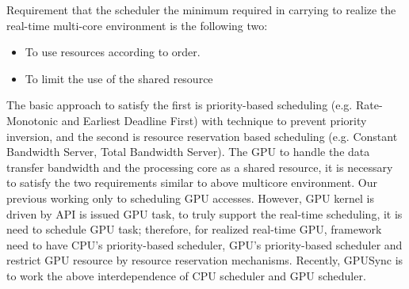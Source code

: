 Requirement that the scheduler the minimum required in carrying to realize the real-time multi-core environment is the following two:
\begin{itemize}
\item To use resources according to order.
\item To limit the use of the shared resource
\end{itemize}
The basic approach to satisfy the first is priority-based scheduling (e.g. Rate-Monotonic\cite{sched:rm} and Earliest Deadline First\cite{sched:edf}) with technique to prevent priority inversion,
and the second is resource reservation based scheduling (e.g. Constant Bandwidth Server\cite{rr:cbs}, Total Bandwidth Server\cite{rr:tbs2}).
The GPU to handle the data transfer bandwidth and the processing core as a shared resource,
it is necessary to satisfy the two requirements similar to above multicore environment.
Our previous working only to scheduling GPU accesses.
However, GPU kernel is driven by API is issued GPU task, to truly support  the real-time scheduling, it is need to schedule GPU task; therefore, for realized real-time GPU, framework need to have CPU's priority-based scheduler, GPU's priority-based scheduler and restrict GPU resource by resource reservation mechanisms.
Recently, GPUSync is to work the above interdependence of CPU scheduler and GPU scheduler.

